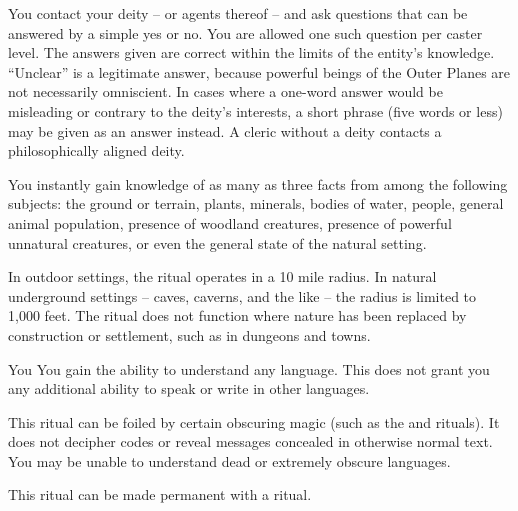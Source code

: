 \spellline
\spelleffect You contact your deity -- or agents thereof -- and ask questions that can be answered by a simple yes or no. You are allowed one such question per caster level. The answers given are correct within the limits of the entity's knowledge. ``Unclear'' is a legitimate answer, because powerful beings of the Outer Planes are not necessarily omniscient. In cases where a one-word answer would be misleading or contrary to the deity's interests, a short phrase (five words or less) may be given as an answer instead.
\spellnotes A cleric without a deity contacts a philosophically aligned deity.

\spellline
\spelleffect You instantly gain knowledge of as many as three facts from among the following subjects: the ground or terrain, plants, minerals, bodies of water, people, general animal population, presence of woodland creatures, presence of powerful unnatural creatures, or even the general state of the natural setting.
\par In outdoor settings, the ritual operates in a 10 mile radius. In natural underground settings -- caves, caverns, and the like -- the radius is limited to 1,000 feet.
\spellnotes The ritual does not function where nature has been replaced by construction or settlement, such as in dungeons and towns.

\spelldur{\durlong}
\begin{spelltarget}{You}
    \spelleffect You gain the ability to understand any language. This does not grant you any additional ability to speak or write in other languages.
\end{spelltarget}
\spellnotes This ritual can be foiled by certain obscuring magic (such as the  and  rituals). It does not decipher codes or reveal messages concealed in otherwise normal text. You may be unable to understand dead or extremely obscure languages.

This ritual can be made permanent with a  ritual.

